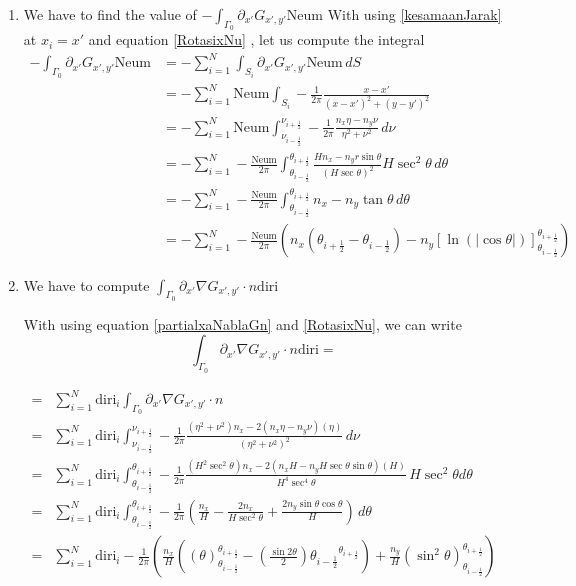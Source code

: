 \documentclass[a4paper,12pt]{article}
\newcommand{\integ}[3]{%
\ensuremath{\displaystyle{\int^{#2}_{#1} #3}}}
\begin{document}
\begin{enumerate}
 \item We have to find the value of $-\integ{\Gamma_0}{}{\partial_{x'} G_{x',y'} \text{Neum}}$
With using \ref{kesamaanJarak} at $x_i=x'$ and equation \ref{RotasixNu} , let us compute the integral
\begin{align}
 -\integ{\Gamma_0}{}{\partial_{x'} G_{x',y'} \text{Neum}}&=-\sum\limits_{i=1}^N  \integ{S_i}{}{\partial_{x'} G_{x',y'} \text{Neum} \, dS}\\
&=-\sum\limits_{i=1}^N \text{Neum} \integ{S_i}{}{-\frac{1}{2\pi}\frac{x-x'}{(x-x')^2+(y-y')^2}}\\
&=-\sum\limits_{i=1}^N \text{Neum} \integ{\nu_{i-\frac{1}{2}}}{\nu_{i+\frac{1}{2}}}{-\frac{1}{2\pi} \frac{n_x\eta-n_y \nu}{\eta^2+\nu^2} \, d\nu}\\
&=-\sum\limits_{i=1}^N -\frac{\text{Neum}}{2\pi} \integ{\theta_{i-\frac{1}{2}}}{\theta_{i+\frac{1}{2}}}{\frac{H n_x-n_y r \sin\theta}{\left( H\sec\theta\right)^2 }H \sec^2\theta \, d\theta}\\
&=-\sum\limits_{i=1}^N -\frac{\text{Neum}}{2\pi} \integ{\theta_{i-\frac{1}{2}}}{\theta_{i+\frac{1}{2}}}{n_x-n_y\tan\theta\, d\theta}\\
&=-\sum\limits_{i=1}^N -\frac{\text{Neum}}{2\pi} \left( n_x(\theta_{i+\frac{1}{2}}- \theta_{i-\frac{1}{2}}) -n_y \left[\ln(\vert \cos\theta\vert )\right]_{\theta_{i-\frac{1}{2}}}^{\theta_{i+\frac{1}{2}}} \right)\label{intPartialG}
\end{align}

\item We have to compute $\integ{\Gamma_0}{}{\partial_{x'}\nabla G_{x',y'} \cdot n \text{diri}}$

With using equation \ref{partialxaNablaGn} and \ref{RotasixNu}, we can write
\[
  \integ{\Gamma_0}{}{\partial_{x'}\nabla G_{x',y'} \cdot n \text{diri}}=
\]

\begin{align}
=& \sum\limits_{i=1}^N \text{diri}_i \integ{\Gamma_0}{}{\partial_{x'}\nabla G_{x',y'} \cdot n}\\
 =& \sum\limits_{i=1}^N \text{diri}_i \integ{\nu_{i-\frac{1}{2}}}{\nu_{i+\frac{1}{2}}}{-\frac{1}{2\pi} \frac{(\eta^2+\nu^2)n_x-2(n_x\eta-n_y\nu)(\eta)}{(\eta^2+\nu^2)^2} \, d\nu}\\
=&\sum\limits_{i=1}^N \text{diri}_i \integ{\theta_{i-\frac{1}{2}}}{\theta_{i+\frac{1}{2}}}{-\frac{1}{2\pi} \frac{(H^2 \sec^2\theta)n_x-2(n_x H-n_y H \sec \theta \sin \theta)(H)}{H^4 \sec^4\theta} \, H \sec^2\theta d\theta}\\
=&\sum\limits_{i=1}^N \text{diri}_i \integ{\theta_{i-\frac{1}{2}}}{\theta_{i+\frac{1}{2}}}{-\frac{1}{2\pi} \left( \frac{n_x}{H}-\frac{2n_x}{H \sec^2\theta}+\frac{2n_y \sin \theta \cos\theta}{H} \right) \, d\theta}\\
=&\sum\limits_{i=1}^N \text{diri}_i -\frac{1}{2\pi} \left(\frac{n_x}{H}\left((\theta)_{\theta_{i-\frac{1}{2}}}^{\theta_{i+\frac{1}{2}}}-(\frac{\sin2\theta}{2}){\theta_{i-\frac{1}{2}}}^{\theta_{i+\frac{1}{2}}} \right)+\frac{n_y}{H}(\sin^2\theta)_{\theta_{i-\frac{1}{2}}}^{\theta_{i+\frac{1}{2}}}\right)\label{intPartialNablaGn}
\end{align}


\end{enumerate}
\end{document}
